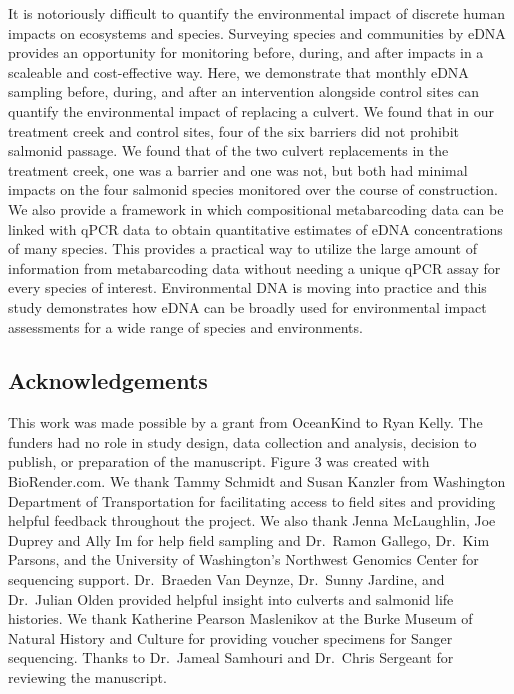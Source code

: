 \documentclass[
]{article}
\begin{document}
It is notoriously difficult to quantify the environmental impact of
discrete human impacts on ecosystems and species. Surveying species and
communities by eDNA provides an opportunity for monitoring before,
during, and after impacts in a scaleable and cost-effective way. Here,
we demonstrate that monthly eDNA sampling before, during, and after an
intervention alongside control sites can quantify the environmental
impact of replacing a culvert. We found that in our treatment creek and
control sites, four of the six barriers did not prohibit salmonid
passage. We found that of the two culvert replacements in the treatment
creek, one was a barrier and one was not, but both had minimal impacts
on the four salmonid species monitored over the course of construction.
We also provide a framework in which compositional metabarcoding data
can be linked with qPCR data to obtain quantitative estimates of eDNA
concentrations of many species. This provides a practical way to utilize
the large amount of information from metabarcoding data without needing
a unique qPCR assay for every species of interest. Environmental DNA is
moving into practice and this study demonstrates how eDNA can be broadly
used for environmental impact assessments for a wide range of species
and environments.

\hypertarget{acknowledgements}{%
\subsection{Acknowledgements}\label{acknowledgements}}

This work was made possible by a grant from OceanKind to Ryan Kelly. The
funders had no role in study design, data collection and analysis,
decision to publish, or preparation of the manuscript. Figure 3 was
created with BioRender.com. We thank Tammy Schmidt and Susan Kanzler
from Washington Department of Transportation for facilitating access to
field sites and providing helpful feedback throughout the project. We
also thank Jenna McLaughlin, Joe Duprey and Ally Im for help field
sampling and Dr.~Ramon Gallego, Dr.~Kim Parsons, and the University of
Washington's Northwest Genomics Center for sequencing support.
Dr.~Braeden Van Deynze, Dr.~Sunny Jardine, and Dr.~Julian Olden provided
helpful insight into culverts and salmonid life histories. We thank
Katherine Pearson Maslenikov at the Burke Museum of Natural History and
Culture for providing voucher specimens for Sanger sequencing. Thanks to
Dr.~Jameal Samhouri and Dr.~Chris Sergeant for reviewing the manuscript.
\end{document}
